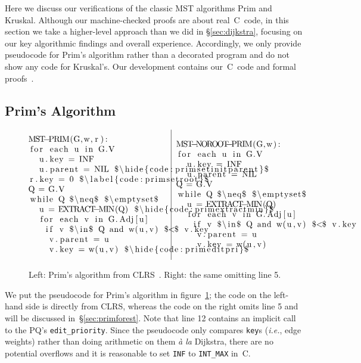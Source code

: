 Here we discuss our verifications of the classic MST algorithms Prim and Kruskal.  Although our machine-checked proofs are about real~C~code, in this section we take a higher-level approach than we did in \S\ref{sec:dijkstra}, focusing on our key algorithmic findings and overall experience.  Accordingly, we only provide pseudocode for Prim's algorithm rather than a decorated program and do not show any code for Kruskal's.  Our development contains our~C~code and formal proofs~\cite{mohan_anshuman_2021_4744665}.

\vspace*{-0.5em}
\subsection{Prim's Algorithm}
\label{sec:prim}

\vspace*{-0.25em}

\begin{figure}[t]
\[
\begin{array}{@{}l@{~~}|@{~~}l@{}}
\begin{minipage}{0.475\textwidth}
\begin{lstlisting}
MST-PRIM(G,w,r):
 for each u in G.V
  u.key = INF
  u.parent = NIL $\hide{code:primsetinitparent}$
 r.key = 0 $\label{code:primsetroot}$
 Q = G.V
 while Q $\neq$ $\emptyset$
  u = EXTRACT-MIN(Q) $\hide{code:primextractmin}$
  for each v in G.Adj[u]
   if v $\in$ Q and w(u,v) $<$ v.key
    v.parent = u
    v.key = w(u,v) $\hide{code:primeditpri}$
\end{lstlisting} \end{minipage} &
\begin{minipage}{0.5\textwidth}
\begin{lstlisting}[numbers=none]
MST-NOROOT-PRIM(G,w):
 for each u in G.V
  u.key = INF
  u.parent = NIL

 Q = G.V
 while Q $\neq$ $\emptyset$
  u = EXTRACT-MIN(Q)
  for each v in G.Adj[u]
   if v $\in$ Q and w(u,v) $<$ v.key
    v.parent = u
    v.key = w(u,v)
\end{lstlisting}
\end{minipage}
\end{array}
\]
\vspace*{-1.2em}
\caption{Left: Prim's algorithm from CLRS~\cite{clrs}. Right: the same omitting line 5.}
\vspace*{-0.3em}
\label{fig:prims}
\end{figure}

We put the pseudocode for Prim's algorithm in figure~\ref{fig:prims}; the code on the left-hand side is directly from CLRS, whereas the code on the right omits line 5 and will be discussed in~\S\ref{sec:primforest}.  Note that line 12 contains an implicit call to the PQ's \texttt{edit\_priority}.  Since the pseudocode only compares \texttt{key}s (\emph{i.e.}, edge weights) rather than doing arithmetic on them \emph{\`a la} Dijkstra, there are no potential overflows and it is reasonable to set \texttt{INF} to \texttt{INT\_MAX} in~C.


